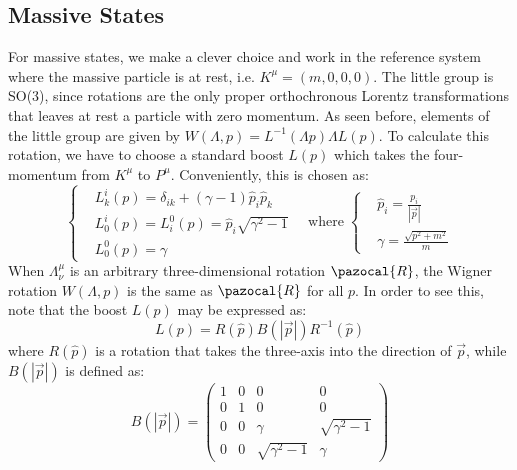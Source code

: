 \documentclass[../main.tex]{subfiles}
\begin{document}
\subsection{Massive States}
For massive states, we make a clever choice and work in the reference system where the massive particle is at rest, i.e. $K^\mu=(m,0,0,0)$. The little group is SO(3), since rotations are the only proper orthochronous Lorentz transformations that leaves at rest a particle with zero momentum. 
As seen before, elements of the little group are given by $W(\Lambda,p)=L^{-1}(\Lambda p)\Lambda L(p)$. To calculate this rotation, we have to choose a standard boost $L(p)$ which takes the four-momentum from $K^\mu$ to $P^\mu$. Conveniently, this is chosen as:
\[
\left\{
\begin{aligned}
&L_k^i(p)=\delta_{ik}+(\gamma-1)\hat{p}_i\hat{p}_k\\
&L^i_0(p)=L^0_i(p)=\hat{p}_i\sqrt{\gamma^2-1}\\
&L^0_0(p)=\gamma
\end{aligned}
\right.
\quad \text{where}\;
\left\{
\begin{aligned}
&\hat{p}_i=\frac{p_i}{|\Vec{p}|}\\
&\gamma=\frac{\sqrt{p^2+m^2}}{m}
\end{aligned}
\right.
\]
When $\Lambda^\mu_\nu$ is an arbitrary three-dimensional rotation $\pazocal{R}$, the Wigner rotation $W(\Lambda,p)$ is the same as $\pazocal{R}$ for all $p$. In order to see this, note that the boost $L(p)$ may be expressed as:
\[
L(p)=R(\hat{p})B(|\Vec{p}|)R^{-1}(\hat{p})
\]
where $R(\hat{p})$ is a rotation that takes the three-axis into the direction of $\Vec{p}$, while $B(|\Vec{p}|)$ is defined as:
\[
B(|\Vec{p}|)=\left(\begin{array}{cccc}
    1 & 0 & 0 & 0 \\
    0 & 1 & 0 & 0 \\
    0 & 0 & \gamma & \sqrt{\gamma^2-1} \\
    0 & 0 & \sqrt{\gamma^2-1} & \gamma 
\end{array}\right)
\]
\end{document}
